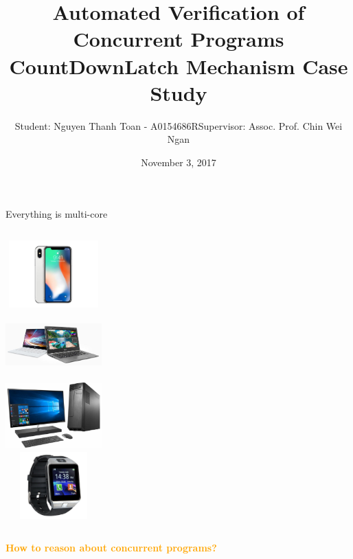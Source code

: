 \documentclass[11pt]{beamer}
\title[QE Presentation]{\normalsize Automated Verification of Concurrent
  Programs\\ CountDownLatch Mechanism Case Study}
\author[Nguyen Thanh Toan]{Student: Nguyen Thanh Toan - A0154686R\newline Supervisor: Assoc. Prof. Chin Wei Ngan}
\institute[]{National University of Singapore}
\date{November 3, 2017}
\newcommand\orange[1]{\textcolor{orange}{\textbf{#1}}}
\begin{document}
\begin{frame}
  \titlepage
\end{frame}

\begin{frame}{Everything is multi-core}
	\begin{columns}[t]
		\centering
		\includegraphics[width=10em,height=7em]{./images/iphone.jpg}\\
		\includegraphics[width=10em,height=7em]{./images/lg-gram.jpg}\\
		\centering
		\includegraphics[width=10em,height=7em]{./images/desktop.jpg}\\
		\includegraphics[width=10em,height=7em]{./images/watch.jpg}
	\end{columns}
\end{frame}

\begin{frame}{}
  \begin{center}
    \orange{How to reason about concurrent programs?}
  \end{center}
\end{frame}
\end{document}

